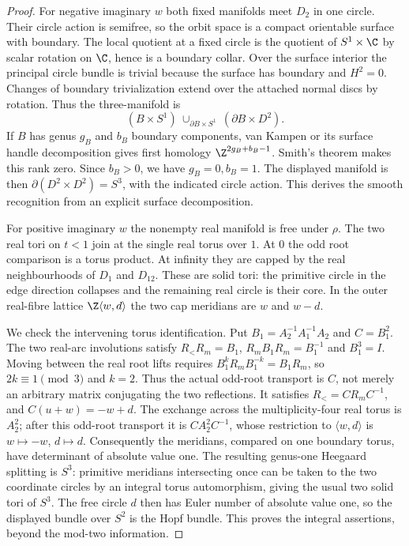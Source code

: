 \begin{proof}
For negative imaginary $w$ both fixed manifolds meet $D_2$ in one circle.
Their circle action is semifree, so the orbit space is a compact
orientable surface with boundary. The local quotient at a fixed circle
is the quotient of $S^1\times\C$ by scalar rotation on $\C$, hence is
a boundary collar. Over the surface interior the principal circle bundle
is trivial because the surface has boundary and $H^2=0$. Changes of
boundary trivialization extend over the attached normal discs by
rotation. Thus the three-manifold is
\[
 (B\times S^1)\ \cup_{\partial B\times S^1}\ (\partial B\times D^2).
\]
If $B$ has genus $g_B$ and $b_B$ boundary components, van Kampen or its
surface handle decomposition gives first homology
$\Z^{2g_B+b_B-1}$. Smith's theorem makes this rank zero. Since $b_B>0$,
we have $g_B=0,b_B=1$. The displayed manifold is then
$\partial(D^2\times D^2)=S^3$, with the indicated circle action. This
derives the smooth recognition from an explicit surface decomposition.

For positive imaginary $w$ the nonempty real manifold is free under
$\rho$. The two real tori on $t<1$ join at the single real torus over
$1$. At $0$ the odd root comparison is a torus product. At infinity
they are capped by the real neighbourhoods of $D_1$ and $D_{12}$.
These are solid tori: the primitive circle in the edge direction
collapses and the remaining real circle is their core. In the outer
real-fibre lattice $\Z\langle w,d\rangle$ the two cap meridians are
$w$ and $w-d$.

We check the intervening torus identification. Put
$B_1=A_2^{-1}A_1^{-1}A_2$ and $C=B_1^2$. The two real-arc involutions
satisfy $R_<R_m=B_1$, $R_mB_1R_m=B_1^{-1}$ and $B_1^3=I$.
Moving between the real root lifts requires
$B_1^kR_mB_1^{-k}=B_1R_m$, so $2k\equiv1\pmod3$ and $k=2$.
Thus the actual odd-root transport is $C$, not merely an arbitrary
matrix conjugating the two reflections. It satisfies $R_<=CR_mC^{-1}$, and
$C(u+w)=-w+d$. The exchange across the multiplicity-four real torus
is $A_2^2$; after this odd-root transport it is
$CA_2^2C^{-1}$, whose restriction to $\langle w,d\rangle$ is
$w\mapsto-w$, $d\mapsto d$. Consequently the meridians, compared on
one boundary torus, have determinant of absolute value one. The
resulting genus-one Heegaard splitting is $S^3$: primitive meridians
intersecting once can be taken to the two coordinate circles by an
integral torus automorphism, giving the usual two solid tori of $S^3$.
The free circle $d$ then has Euler number of absolute value one, so
the displayed bundle over $S^2$ is the Hopf bundle. This proves the
integral assertions, beyond the mod-two information.
\end{proof}

